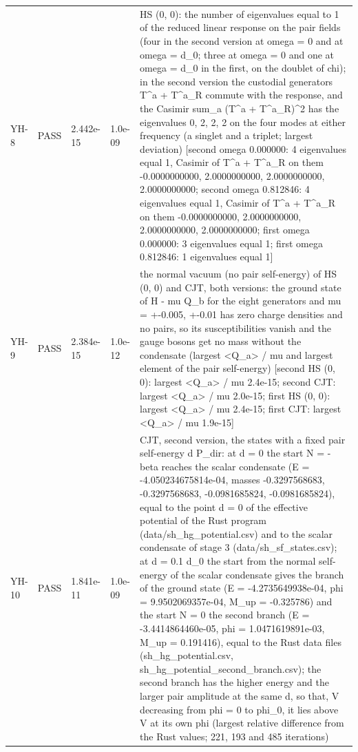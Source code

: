 \documentclass[aps,prd,onecolumn,superscriptaddress,nofootinbib,floatfix,longbibliography]{revtex4-2}
\begin{document}
\begin{longtable}{p{}p{}p{}p{}p{}}
YH-8 & PASS & 2.442e-15 & 1.0e-09 & HS (0, 0): the number of eigenvalues equal to 1 of the reduced linear response on the pair fields (four in the second version at omega = 0 and at omega = d\_0; three at omega = 0 and one at omega = d\_0 in the first, on the doublet of chi); in the second version the custodial generators T\textasciicircum{}a + T\textasciicircum{}a\_R commute with the response, and the Casimir sum\_a (T\textasciicircum{}a + T\textasciicircum{}a\_R)\textasciicircum{}2 has the eigenvalues 0, 2, 2, 2 on the four modes at either frequency (a singlet and a triplet; largest deviation) [second omega 0.000000: 4 eigenvalues equal 1, Casimir of T\textasciicircum{}a + T\textasciicircum{}a\_R on them -0.0000000000, 2.0000000000, 2.0000000000, 2.0000000000; second omega 0.812846: 4 eigenvalues equal 1, Casimir of T\textasciicircum{}a + T\textasciicircum{}a\_R on them -0.0000000000, 2.0000000000, 2.0000000000, 2.0000000000; first omega 0.000000: 3 eigenvalues equal 1; first omega 0.812846: 1 eigenvalues equal 1] \\
YH-9 & PASS & 2.384e-15 & 1.0e-12 & the normal vacuum (no pair self-energy) of HS (0, 0) and CJT, both versions: the ground state of H - mu Q\_b for the eight generators and mu = +-0.005, +-0.01 has zero charge densities and no pairs, so its susceptibilities vanish and the gauge bosons get no mass without the condensate (largest \textbar{}\textless{}Q\_a\textgreater{}\textbar{} / \textbar{}mu\textbar{} and largest element of the pair self-energy) [second HS (0, 0): largest \textbar{}\textless{}Q\_a\textgreater{}\textbar{} / \textbar{}mu\textbar{} 2.4e-15; second CJT: largest \textbar{}\textless{}Q\_a\textgreater{}\textbar{} / \textbar{}mu\textbar{} 2.0e-15; first HS (0, 0): largest \textbar{}\textless{}Q\_a\textgreater{}\textbar{} / \textbar{}mu\textbar{} 2.4e-15; first CJT: largest \textbar{}\textless{}Q\_a\textgreater{}\textbar{} / \textbar{}mu\textbar{} 1.9e-15] \\
YH-10 & PASS & 1.841e-11 & 1.0e-09 & CJT, second version, the states with a fixed pair self-energy d P\_dir: at d = 0 the start N = -beta reaches the scalar condensate (E = -4.050234675814e-04, masses -0.3297568683, -0.3297568683, -0.0981685824, -0.0981685824), equal to the point d = 0 of the effective potential of the Rust program (data/sh\_hg\_potential.csv) and to the scalar condensate of stage 3 (data/sh\_sf\_states.csv); at d = 0.1 d\_0 the start from the normal self-energy of the scalar condensate gives the branch of the ground state (E = -4.2735649938e-04, phi = 9.9502069357e-04, M\_up = -0.325786) and the start N = 0 the second branch (E = -3.4414864460e-05, phi = 1.0471619891e-03, M\_up = 0.191416), equal to the Rust data files (sh\_hg\_potential.csv, sh\_hg\_potential\_second\_branch.csv); the second branch has the higher energy and the larger pair amplitude at the same d, so that, V decreasing from phi = 0 to phi\_0, it lies above V at its own phi (largest relative difference from the Rust values; 221, 193 and 485 iterations) \\
\end{longtable}
\endgroup
\end{document}
